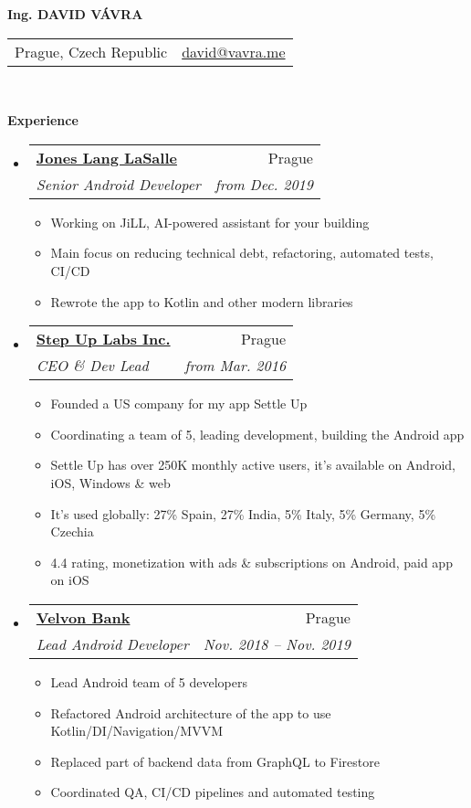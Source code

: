 \documentclass[letterpaper,11pt]{article}
\makeatletter
\newcommand{\resitem}[1]{\item #1 \vspace{-2pt}}
\newcommand{\resheading}[1]{{\large \colorbox{mygrey}{\begin{minipage}{\textwidth}{\textbf{#1 \vphantom{p\^{E}}}}\end{minipage}}}}
\newcommand{\ressubheading}[4]{
\begin{tabular*}{6.5in}{l@{\extracolsep{\fill}}r}
		\textbf{#1} & #2 \\
		\textit{#3} & \textit{#4} \\
\end{tabular*}\vspace{-6pt}}
\makeatother
\begin{document}
\newcommand{\myheader}{
\begin{center}
\textbf{\Huge Ing. DAVID VÁVRA}
\end{center} 
\begin{tabular*}{7in}{l@{\extracolsep{\fill}}r}
	Prague, Czech Republic &  \href{mailto:david@vavra.me}{david@vavra.me} \\
	\end{tabular*}
\\
\vspace{0.1in}}

\myheader



\resheading{Experience}
	\begin{itemize}
	\item 
			\ressubheading{\href{https://www.us.jll.com/}{Jones Lang LaSalle}}{Prague}{Senior Android Developer}{from Dec. 2019}
				{ \footnotesize
				\begin{itemize}
					\resitem{Working on JiLL, AI-powered assistant for your building}
					\resitem{Main focus on reducing technical debt, refactoring, automated tests, CI/CD}
					\resitem{Rewrote the app to Kotlin and other modern libraries}
				\end{itemize}
				}	
	\item 
			\ressubheading{\href{https://stepuplabs.io}{Step Up Labs Inc.}}{Prague}{CEO \& Dev Lead}{from Mar. 2016}
				{ \footnotesize
				\begin{itemize}
					\resitem{Founded a US company for my app Settle Up}
					\resitem{Coordinating a team of 5, leading development, building the Android app}
					\resitem{Settle Up has over 250K monthly active users, it's available on Android, iOS, Windows \& web}
					\resitem{It's used globally: 27\% Spain, 27\% India, 5\% Italy, 5\% Germany, 5\% Czechia}
					\resitem{4.4 rating, monetization with ads \& subscriptions on Android, paid app on iOS}
					
				\end{itemize}
				}	
	\item 
			\ressubheading{\href{https://airbank.net}{Velvon Bank}}{Prague}{Lead Android Developer}{Nov. 2018 -- Nov. 2019}
				{ \footnotesize
				\begin{itemize}
					\resitem{Lead Android team of 5 developers }
					\resitem{Refactored Android architecture of the app to use Kotlin/DI/Navigation/MVVM }
					\resitem{Replaced part of backend data from GraphQL to Firestore}
					\resitem{Coordinated QA, CI/CD pipelines and automated testing}
					

\end{itemize}}
\end{itemize}
\end{document}
